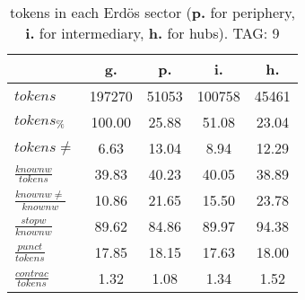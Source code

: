\begin{table}[h!]
\begin{center}
\begin{tabular}{| l || c | c | c | c |}\hline
 & {\bf g.} & {\bf p.} & {\bf i.} & {\bf h.} \\\hline\hline
$tokens$ & 197270  & 51053  & 100758  & 45461 \\
$tokens_{\%}$ & 100.00  & 25.88  & 51.08  & 23.04 \\
$tokens \neq$ & 6.63  & 13.04  & 8.94  & 12.29 \\\hline
$\frac{knownw}{tokens}$ & 39.83  & 40.23  & 40.05  & 38.89 \\
$\frac{knownw \neq}{knownw}$ & 10.86  & 21.65  & 15.50  & 23.78 \\\hline
$\frac{stopw}{knownw}$ & 89.62  & 84.86  & 89.97  & 94.38 \\
$\frac{punct}{tokens}$ & 17.85  & 18.15  & 17.63  & 18.00 \\
$\frac{contrac}{tokens}$ & 1.32  & 1.08  & 1.34  & 1.52 \\\hline
\end{tabular}
\caption{tokens in each Erd\"os sector ({{\bf p.}} for periphery, {{\bf i.}} for intermediary, 
    {{\bf h.}} for hubs). TAG: 9}
\end{center}
\end{table}